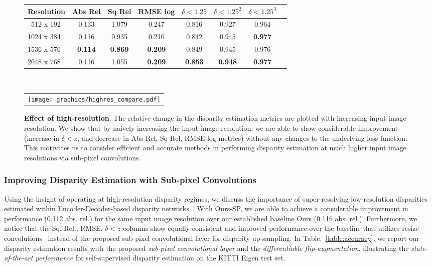 \documentclass[letterpaper, 10 pt, conference]{ieeeconf}  \IEEEoverridecommandlockouts
\begin{document}
\begin{figure}[!h]
\centering
{
\footnotesize
\setlength{\tabcolsep}{0.1em}
\begin{tabular}{lccccccc}
\toprule
\textbf{Resolution} & 
Abs Rel &
Sq Rel &
RMSE log &
$\delta < 1.25$ &
$\delta < 1.25^2$ &
$\delta < 1.25^3$\vspace{0.5mm}\\
\midrule
~512 x 192  & 0.133 & 1.079 &  0.247 &  0.816 &  0.927 &  0.964\\
1024 x 384 & 0.116 & 0.935 &  0.210 &  0.842 &  0.945 &  \textbf{0.977}\\
1536 x 576 & \textbf{0.114} & \textbf{0.869} &  \textbf{0.209} &  0.849 &  0.945 &  0.976\\
2048 x 768 & 0.116 & 1.055 &  \textbf{0.209} &  \textbf{0.853} &  \textbf{0.948} &  \textbf{0.977}\\
\bottomrule
\end{tabular}\\\vspace{0mm}
}
{
\renewcommand{\arraystretch}{0.4} \begin{tabular}{c}
    \texttt{[image: graphics/highres\_compare.pdf]}
  \end{tabular}
}
  \caption{\textbf{Effect of high-resolution}: The relative change in the disparity estimation metrics are plotted with increasing input image resolution. We show that by naively increasing the input image resolution, we are able to show considerable improvement (increase in $\delta < z$, and decrease in Abs Rel, Sq Rel, RMSE log metrics) without any changes to the underlying loss function. This motivates us to consider efficient and accurate methods in performing disparity estimation at much higher input image resolutions via sub-pixel convolutions.}
  \label{fig:highres-compare}
\end{figure}
 


\subsubsection{Improving Disparity Estimation with Sub-pixel Convolutions}
Using the insight of operating at high-resolution disparity regimes, we discuss the importance of super-resolving low-resolution disparities estimated within Encoder-Decoder-based disparity networks~\cite{mayer2016large,yang2018deep,ummenhofer2017demon}. With Ours-SP, we are able to achieve a considerable improvement in performance (0.112 abs. rel.) for the same input image resolution over our established baseline Ours (0.116 abs. rel.). Furthermore, we notice that the Sq. Rel., RMSE, $\delta < z$ columns show equally consistent and improved performance over the baseline that utilizes resize-convolutions~\cite{odena2016deconvolution} instead of the proposed sub-pixel convolutional layer for disparity up-sampling. In Table.~\ref{table:accuracy}, we report our disparity estimation results with the proposed \textit{sub-pixel convolutional layer} and the \textit{differentiable flip-augmentation}, illustrating the \textit{state-of-the-art performance} for self-supervised disparity estimation on the KITTI Eigen test set. 
\end{document}
